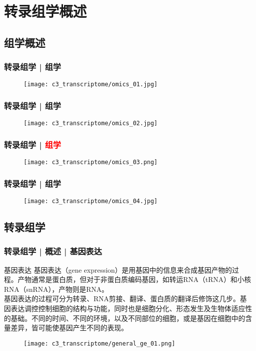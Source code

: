 \section{转录组学概述}
\subsection{组学概述}
\begin{frame}
  \frametitle{转录组学 | 组学}
  \begin{figure}
    \centering
    \texttt{[image: c3\_transcriptome/omics\_01.jpg]}
  \end{figure}
\end{frame}

\begin{frame}
  \frametitle{转录组学 | 组学}
  \begin{figure}
    \centering
    \texttt{[image: c3\_transcriptome/omics\_02.jpg]}
  \end{figure}
\end{frame}

\begin{frame}
  \frametitle{转录组学 | \textcolor{red}{组学}}
  \begin{figure}
    \centering
    \texttt{[image: c3\_transcriptome/omics\_03.png]}
  \end{figure}
\end{frame}

\begin{frame}
  \frametitle{转录组学 | 组学}
  \begin{figure}
    \centering
    \texttt{[image: c3\_transcriptome/omics\_04.jpg]}
  \end{figure}
\end{frame}

\subsection{转录组学}
\begin{frame}
  \frametitle{转录组学 | 概述 | 基因表达}
  \begin{block}{基因表达}
 基因表达（gene expression）是用基因中的信息来合成基因产物的过程。产物通常是蛋白质，但对于非蛋白质编码基因，如转运RNA（tRNA）和小核RNA（snRNA），产物则是RNA。\\
 \vspace{0.5em}
基因表达的过程可分为转录、RNA剪接、翻译、蛋白质的翻译后修饰这几步。基因表达调控控制细胞的结构与功能，同时也是细胞分化、形态发生及生物体适应性的基础。不同的时间、不同的环境，以及不同部位的细胞，或是基因在细胞中的含量差异，皆可能使基因产生不同的表现。
  \end{block}
  \begin{figure}
    \centering
    \texttt{[image: c3\_transcriptome/general\_ge\_01.png]}
  \end{figure}
\end{frame}

